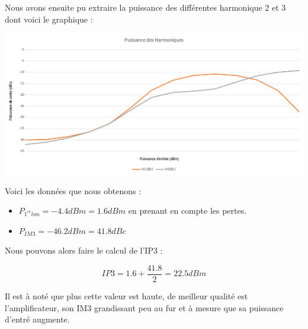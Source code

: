 \documentclass[a4paper,12pt]{report}            %
\begin{document}
    
Nous avons ensuite pu extraire la puissance des différentes harmonique 2 et 3 dont voici le graphique :

\begin{center}\includegraphics[scale = 0.4]{pic/harmonique_graph.png}\\ \end{center}

Voici les données que nous obtenons :
\begin{itemize}
    \item $P_{1^{er}ton} = -4.4dBm = 1.6dBm$ en prenant en compte les pertes.
    \item $P_{IM3} = -46.2dBm = 41.8dBc$
\end{itemize}

Nous pouvons alors faire le calcul de l'IP3 : 

$$IP3 = 1.6 + \frac{41.8}{2} = 22.5dBm $$

Il est à noté que plus cette valeur est haute, de meilleur qualité est l'amplificateur, son IM3
grandissant peu au fur et à mesure que sa puissance d'entré augmente.
\end{document}
